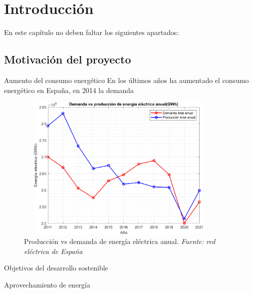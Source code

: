 \chapter{Introducción}

En este capítulo no deben faltar los siguientes apartados:

\section{Motivación del proyecto}

{Aumento del consumo energético}
En los últimos años ha aumentado el consumo energético en España, en 2014 la demanda 

\begin{figure}[h]
	\centering
	\includegraphics[width=10cm, height=7cm]{figuras/ProdcVSdemAnual}
	\caption[Producción vs demanda de energía eléctrica anual]{Producción vs demanda de energía eléctrica anual. \textit{Fuente: red eléctrica de España} }
	\label{fig:prodcvsdemanual}
\end{figure}



Objetivos del desarrollo sostenible

{Aprovechamiento de energía}



